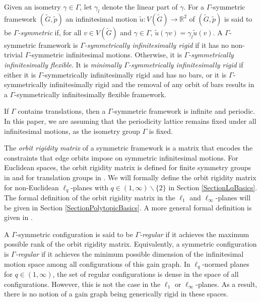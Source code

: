 \documentclass[reqno,a4paper,10pt]{article}
\theoremstyle{definition}
\theoremstyle{remark}
\numberwithin{equation}{section}
\numberwithin{figure}{section}
\numberwithin{table}{section}
\newcommand{\R}{\mathbb{R}}
\newcommand{\G}{\tilde{G}}
\newcommand{\p}{\tilde{p}}
\begin{document}
    Given an isometry $\gamma\in\Gamma$, let $\gamma_l$ denote the linear part of $\gamma$. For a $\Gamma$-symmetric framework $(\G,\p)$ an infinitesimal motion $\tilde{u}:V(\G)\to\R^2$ of $(\G,\p)$ is said to be \emph{$\Gamma$-symmetric} if, for all $v\in V(\G)$ and $\gamma\in\Gamma$, $\tilde{u}(\gamma v)=\gamma_l\tilde{u}(v)$. A $\Gamma$-symmetric framework is \emph{$\Gamma$-symmetrically infinitesimally rigid} if it has no non-trivial $\Gamma$-symmetric infinitesimal motions. Otherwise, it is \emph{$\Gamma$-symmetrically infinitesimally flexible}. It is \emph{minimally $\Gamma$-symmetrically infinitesimally rigid} if either it is $\Gamma$-symmetrically infinitesimally rigid and has no bars, or    
    it is $\Gamma$-symmetrically infinitesimally rigid and the removal of any orbit of bars results in a $\Gamma$-symmetrically infinitesimally flexible framework. 

    If $\Gamma$ contains translations, then a $\Gamma$-symmetric framework is infinite and periodic. In this paper, we are assuming that the periodicity lattice remains fixed under all infinitesimal motions, as the isometry group $\Gamma$ is fixed.

    The \emph{orbit rigidity matrix} of a symmetric framework is a matrix that encodes the constraints that edge orbits impose on symmetric infinitesimal motions. For Euclidean spaces, the orbit rigidity matrix is defined for finite symmetry groups in \cite{Orbit} and for translation groups in \cite{Inductive}. We will formally define the orbit rigidity matrix for non-Euclidean $\ell_q$-planes with $q\in(1,\infty)\backslash\{2\}$ in Section \ref{SectionLqBasics}. The formal definition of the orbit rigidity matrix in the $\ell_1$ and $\ell_\infty$-planes will be given in Section \ref{SectionPolytopicBasics}. A more general formal definition is given in \cite{KastisSymbol}. 
    
    A $\Gamma$-symmetric configuration is said to be \emph{$\Gamma$-regular} if it achieves the maximum possible rank of the orbit rigidity matrix. Equivalently, a symmetric configuration is \emph{$\Gamma$-regular} if it achieves the minimum possible dimension of the infinitesimal motion space among all configurations of this gain graph. In $\ell_q$-normed planes for $q\in(1,\infty)$, the set of regular configurations is dense in the space of all configurations. However, this is not the case in the $\ell_1$ or $\ell_\infty$-planes. As a result, there is no notion of a gain graph being generically rigid in these spaces.
\end{document}
